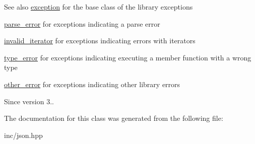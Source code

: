 \begin{DoxySeeAlso}{See also}
\hyperlink{classnlohmann_1_1detail_1_1exception}{exception} for the base class of the library exceptions 

\hyperlink{classnlohmann_1_1detail_1_1parse__error}{parse\+\_\+error} for exceptions indicating a parse error 

\hyperlink{classnlohmann_1_1detail_1_1invalid__iterator}{invalid\+\_\+iterator} for exceptions indicating errors with iterators 

\hyperlink{classnlohmann_1_1detail_1_1type__error}{type\+\_\+error} for exceptions indicating executing a member function with a wrong type 

\hyperlink{classnlohmann_1_1detail_1_1other__error}{other\+\_\+error} for exceptions indicating other library errors
\end{DoxySeeAlso}
\begin{DoxySince}{Since}
version 3.. 
\end{DoxySince}


The documentation for this class was generated from the following file\+:\begin{DoxyCompactItemize}
\item 
inc/json.\+hpp\end{DoxyCompactItemize}
